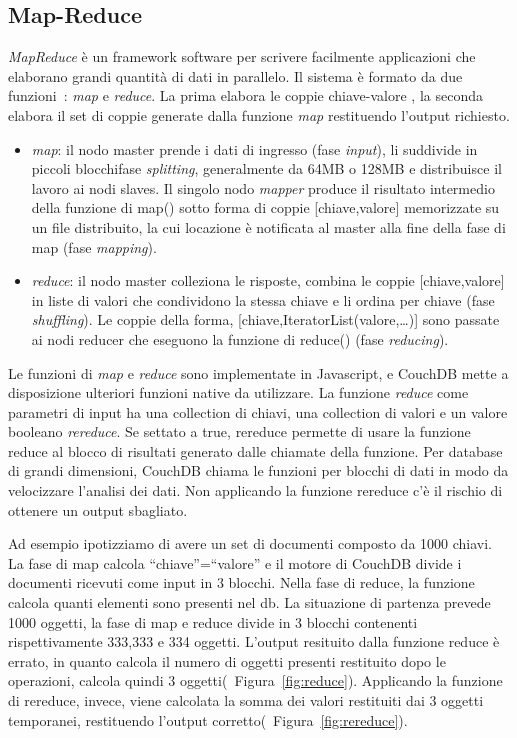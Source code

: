 \newpage
\subsection{Map-Reduce}
\emph{MapReduce} è un framework software per scrivere facilmente applicazioni
che elaborano grandi quantità di dati in parallelo. Il sistema è formato da due
funzioni~: \emph{map} e \emph{reduce}. La prima elabora le coppie chiave-valore
, la seconda elabora il set di coppie generate dalla funzione \emph{map} 
restituendo l'output richiesto.
\begin{itemize}
  \item \emph{map}: il nodo master prende i dati di ingresso (fase
  \emph{input}), li suddivide in piccoli blocchifase
  \emph{splitting}, generalmente da 64MB o 128MB e distribuisce il lavoro ai
  nodi slaves. Il singolo nodo \emph{mapper} produce il risultato intermedio della
  funzione di map() sotto forma di coppie [chiave,valore] memorizzate su un file
  distribuito, la cui locazione è notificata al master alla fine della fase di
  map (fase \emph{mapping}).
  \item \emph{reduce}: il nodo master colleziona le risposte, combina le coppie
  [chiave,valore] in liste di valori che condividono la stessa chiave e li
  ordina per chiave (fase
  \emph{shuffling}). Le coppie della forma,
  [chiave,IteratorList(valore,\ldots)] sono passate ai nodi reducer che
  eseguono la funzione di reduce() (fase
  \emph{reducing}).
\end{itemize}
Le funzioni di \emph{map} e \emph{reduce} sono implementate in Javascript, e
CouchDB mette a disposizione ulteriori funzioni native da utilizzare.
La funzione \emph{reduce} come parametri di input ha una collection di chiavi,
una collection di valori e un valore booleano \emph{rereduce}. Se settato a
true, rereduce permette di usare la funzione reduce al blocco di risultati
generato dalle chiamate della funzione. Per database di grandi dimensioni,
CouchDB chiama le funzioni per blocchi di dati in modo da velocizzare l'analisi
dei dati. Non applicando la funzione rereduce c'è il rischio di ottenere un
output sbagliato.

 Ad esempio ipotizziamo di avere un set di documenti
composto da 1000 chiavi.
La fase di map calcola ``chiave''=``valore'' e il motore di CouchDB divide i
documenti ricevuti come input in 3 blocchi. Nella fase di reduce, la funzione
calcola quanti elementi sono presenti nel db. La situazione di partenza prevede
1000 oggetti, la fase di map e reduce divide in 3 blocchi contenenti
rispettivamente 333,333 e 334 oggetti.
L'output resituito dalla funzione reduce è errato, in quanto calcola il numero
di oggetti presenti restituito dopo le operazioni, calcola quindi 3
oggetti(~Figura~\ref{fig:reduce}).
Applicando la funzione di rereduce, invece, viene calcolata la somma dei valori
restituiti dai 3 oggetti temporanei, restituendo l'output
corretto(~Figura~\ref{fig:rereduce}).


